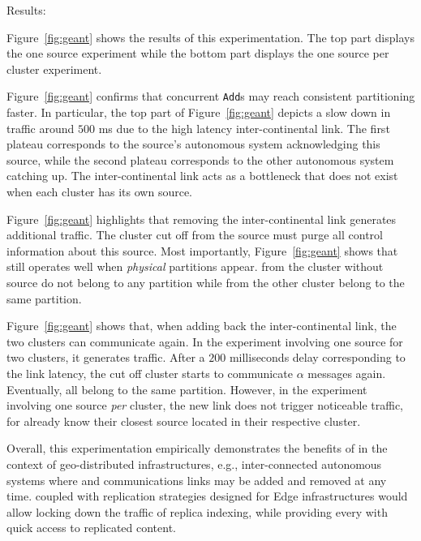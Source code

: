 \begin{asparadesc}
\item [Results:]

Figure~\ref{fig:geant} shows the results of this experimentation. The
top part displays the one source experiment while the bottom part
displays the one source per cluster experiment.

\noindent Figure~\ref{fig:geant} confirms that concurrent
\texttt{Add}s may reach consistent partitioning faster. In particular,
the top part of Figure~\ref{fig:geant} depicts a slow down in traffic
around $500$ ms due to the high latency inter-continental link. The
first plateau corresponds to the source's autonomous system
acknowledging this source, while the second plateau corresponds to the
other autonomous system catching up.  The inter-continental link acts
as a bottleneck that does not exist when each cluster has its own
source.

\noindent Figure~\ref{fig:geant} highlights that removing the
inter-continental link generates additional traffic. The cluster cut
off from the source must purge all control information about this
source.  Most importantly, Figure~\ref{fig:geant} shows that \NAME
still operates well when \emph{physical} partitions appear. \Processes
from the cluster without source do not belong to any partition while
\processes from the other cluster belong to the same partition. 

\noindent Figure~\ref{fig:geant} shows that, when adding back the
inter-continental link, the two clusters can communicate again. In the
experiment involving one source for two clusters, it generates
traffic. After a $200$ milliseconds delay corresponding to the link latency, the
cut off cluster starts to communicate $\alpha$ messages
again. Eventually, all \processes belong to the same
partition. However, in the experiment involving one source \emph{per}
cluster, the new link does not trigger noticeable traffic, for
\processes already know their closest source located in their
respective cluster.

\noindent Overall, this experimentation empirically demonstrates the
benefits of \NAME in the context of geo-distributed infrastructures,
e.g., inter-connected autonomous systems where \processes and
communications links may be added and removed at any time. \NAME
coupled with replication strategies designed for Edge infrastructures
would allow locking down the traffic of replica indexing, while
providing every \process with quick access to replicated content.

\end{asparadesc}


